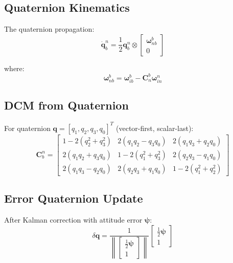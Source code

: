 \documentclass[11pt,a4paper]{article}
\newcommand{\mat}[1]{\mathbf{#1}}
\newcommand{\vect}[1]{\boldsymbol{#1}}
\newcommand{\quat}[1]{\mathbf{#1}}
\begin{document}
\subsection{Quaternion Kinematics}

The quaternion propagation:
\begin{equation}
    \dot{\quat{q}}_b^n = \frac{1}{2}\quat{q}_b^n \otimes \begin{bmatrix}
        \vect{\omega}_{nb}^b \\ 0
    \end{bmatrix}
\end{equation}

where:
\begin{equation}
    \vect{\omega}_{nb}^b = \vect{\omega}_{ib}^b - \mat{C}_n^b \vect{\omega}_{in}^n
\end{equation}

\subsection{DCM from Quaternion}

For quaternion $\quat{q} = [q_1, q_2, q_3, q_0]^T$ (vector-first, scalar-last):
\begin{equation}
    \mat{C}_b^n = \begin{bmatrix}
        1-2(q_2^2+q_3^2) & 2(q_1q_2-q_3q_0) & 2(q_1q_3+q_2q_0) \\
        2(q_1q_2+q_3q_0) & 1-2(q_1^2+q_3^2) & 2(q_2q_3-q_1q_0) \\
        2(q_1q_3-q_2q_0) & 2(q_2q_3+q_1q_0) & 1-2(q_1^2+q_2^2)
    \end{bmatrix}
\end{equation}

\subsection{Error Quaternion Update}

After Kalman correction with attitude error $\vect{\psi}$:
\begin{equation}
    \delta\quat{q} = \frac{1}{\left\|\begin{bmatrix} \frac{1}{2}\vect{\psi} \\ 1 \end{bmatrix}\right\|}
    \begin{bmatrix} \frac{1}{2}\vect{\psi} \\ 1 \end{bmatrix}
\end{equation}
\end{document}
